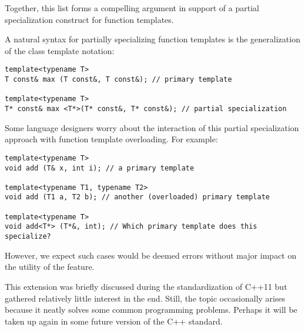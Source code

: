 Together, this list forms a compelling argument in support of a partial specialization construct for function templates.

A natural syntax for partially specializing function templates is the generalization of the class template notation:

\begin{lstlisting}[style=styleCXX]
template<typename T>
T const& max (T const&, T const&); // primary template

template<typename T>
T* const& max <T*>(T* const&, T* const&); // partial specialization
\end{lstlisting}

Some language designers worry about the interaction of this partial specialization approach with function template overloading. For example:

\begin{lstlisting}[style=styleCXX]
template<typename T>
void add (T& x, int i); // a primary template

template<typename T1, typename T2>
void add (T1 a, T2 b); // another (overloaded) primary template

template<typename T>
void add<T*> (T*&, int); // Which primary template does this specialize?
\end{lstlisting}

However, we expect such cases would be deemed errors without major impact on the utility of the feature.

This extension was briefly discussed during the standardization of C++11 but gathered relatively little interest in the end. Still, the topic occasionally arises because it neatly solves some common programming problems. Perhaps it will be taken up again in some future version of the C++ standard.






















